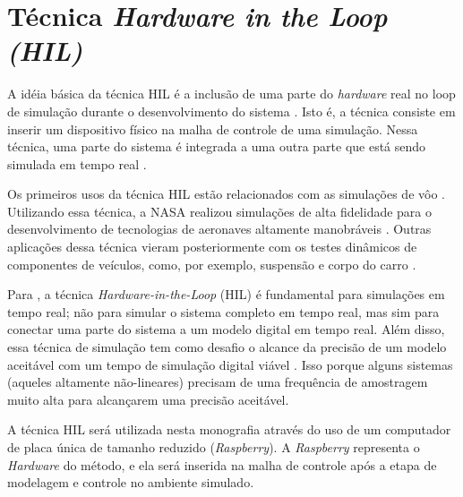\section{Técnica \textit{Hardware in the Loop (HIL)}}

A idéia básica da técnica HIL é a inclusão de 
uma parte do \textit{hardware} real no loop de simulação durante o desenvolvimento 
do sistema \cite{Bacic}. Isto é, a técnica consiste em inserir um dispositivo físico 
na malha de controle de uma simulação. Nessa técnica, uma parte do sistema é integrada 
a uma outra parte que está sendo simulada em tempo real \cite{Abourida}.

Os primeiros usos da técnica HIL estão relacionados com 
as simulações de vôo \cite{Isermann}. Utilizando essa técnica, a NASA realizou simulações de alta 
fidelidade para o desenvolvimento de tecnologias de aeronaves altamente manobráveis \cite{Evans}. 
Outras aplicações dessa técnica vieram posteriormente com os testes dinâmicos de componentes 
de veículos, como, por exemplo, suspensão e corpo do carro \cite{Isermann}.

Para , a técnica \textit{Hardware-in-the-Loop} (HIL) é fundamental
para simulações em tempo real; não para simular o sistema completo em tempo real, mas sim
para conectar uma parte do sistema a um modelo digital em tempo real. Além disso, essa técnica
de simulação tem como desafio o alcance da precisão de um modelo aceitável com um tempo de simulação 
digital viável \cite{Abourida}. Isso porque alguns sistemas (aqueles altamente não-lineares)
precisam de uma frequência de amostragem muito alta para alcançarem uma precisão aceitável.

A técnica HIL será utilizada nesta monografia através do uso de um computador de placa única
de tamanho reduzido (\textit{Raspberry}). A \textit{Raspberry} representa o \textit{Hardware} 
do método, e ela será inserida na malha de controle após a etapa de modelagem e controle no 
ambiente simulado.

\clearpage